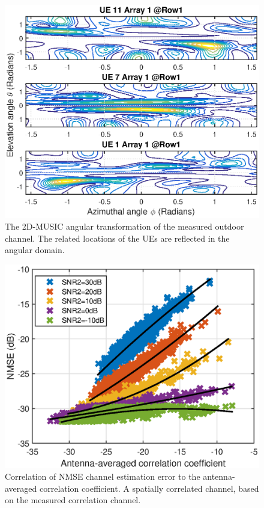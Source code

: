 \begin{figure}[t!]
	\centering
	\includegraphics[width=1\linewidth]{figures/2DMUSICcollocated_row1_array1.eps}
	\caption{The 2D-MUSIC angular transformation of the measured outdoor channel. The related locations of the UEs are reflected in the angular domain.}
	\label{fig:2DMUSIC-measured-collocated-channel}
\end{figure}




\begin{figure}[t!]
	\centering
	\includegraphics[width=1.0\linewidth]{figures/NMSE_correlation_allcases_collocated_wPA.eps}
	\caption{Correlation of NMSE channel estimation error to the antenna-averaged correlation coefficient. A spatially correlated channel, based on
the measured correlation channel.}
	\label{fig:channel_correlation_measured}
\end{figure}


